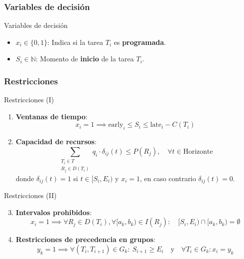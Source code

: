 \documentclass[pdfpagelabels=false, usepdftitle=false, aspectratio=169]{beamer}
\begin{document}
\subsubsection{Variables de decisión}
\begin{frame}{Variables de decisión}
\begin{itemize}
    \item \( x_i \in \{0, 1\} \): Indica si la tarea \( T_i \) es \textbf{programada}.
    \item \( S_i \in \mathbb{N} \): Momento de \textbf{inicio} de la tarea \( T_i \).
\end{itemize}
\vfill
\end{frame}

\subsubsection{Restricciones}
\begin{frame}{Restricciones (I)}
\begin{enumerate}
    \item \textbf{Ventanas de tiempo}:
    \[
      x_i = 1 \implies \text{early}_i \leq S_i \leq \text{late}_i - C(T_i)
    \]
    \vfill
    \item \textbf{Capacidad de recursos}:
    \[
      \sum_{\substack{T_i \in T \\ R_j \in D(T_i)}} q_i \cdot \delta_{ij}(t) \leq P(R_j), 
      \quad \forall t \in \text{Horizonte}
    \]
    donde \( \delta_{ij}(t) = 1 \) si \( t \in [S_i, E_i) \) y \( x_i = 1 \), en caso contrario \( \delta_{ij}(t) = 0 \).
\end{enumerate}
\vfill
\end{frame}

\begin{frame}{Restricciones (II)}
\begin{enumerate}
  \setcounter{enumi}{2} %
    \item \textbf{Intervalos prohibidos}:
    \[
      x_i = 1 \implies \forall R_j \in D(T_i), \forall [a_k, b_k) \in I(R_j):
      \quad [S_i, E_i) \cap [a_k, b_k) = \emptyset
    \]
    \vfill
    \item \textbf{Restricciones de precedencia en grupos}:
    \[
      y_k = 1 \implies \forall (T_i, T_{i+1}) \in G_k: \ S_{i+1} \geq E_i 
      \quad \text{y} \quad \forall T_i \in G_k: x_i = y_k
    \]
    \vfill
\end{enumerate}
\vfill
\end{frame}
\end{document}
